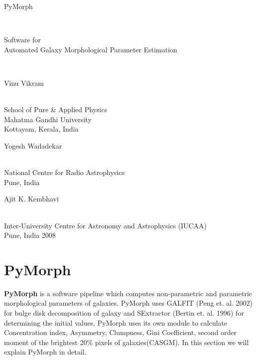 \documentclass[a4paper,10pt]{article}
\begin{document}
\begin{titlepage}
\begin{center}

\begin{Huge}PyMorph\end{Huge}\\
\begin{Large}Software for \\Automated Galaxy Morphological Parameter Estimation\end{Large}\\

\begin{large}
\end{large}
\vspace{5cm}
\vspace{0.5cm}
\begin{Large}Vinu Vikram\end{Large}\\
School of Pure \& Applied Physics\\
Mahatma Gandhi University\\
Kottayam, Kerala, India\\
\vspace{0.3cm}
\begin{Large}Yogesh Wadadekar\end{Large}\\
National Centre for Radio Astrophysics\\
Pune, India\\
\vspace{0.3cm}
\begin{Large}Ajit K. Kembhavi \end{Large}\\
Inter-University Centre for Astronomy and Astrophysics (IUCAA)\\
Pune, India
\vspace{5cm}
2008
\end{center}
\end{titlepage}
\tableofcontents
\clearpage
\section{PyMorph}
{\bf PyMorph} is a software pipeline which computes non-parametric and parametric morphological parameters of galaxies. PyMorph uses GALFIT (Peng et. al. 2002) for bulge disk decomposition of galaxy and SExtractor (Bertin et. al. 1996) for determining the initial values. PyMorph uses its own module to calculate Concentration index, Asymmetry, Clumpness, Gini Coefficient, second order moment of the brightest 20\% pixels of galaxies(CASGM). In this section we will explain PyMorph in detail.
\end{document}
